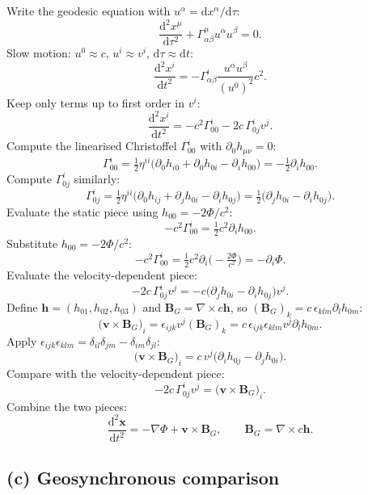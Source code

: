\documentclass[11pt]{article}
\newcommand{\de}{\mathrm{d}}
\renewcommand{\vb}[1]{\mathbf{#1}}
\begin{document}
Write the geodesic equation with $u^{\alpha}=\de x^{\alpha}/\de\tau$:
\[
\frac{\de^{2}x^{\mu}}{\de\tau^{2}}+\Gamma^{\mu}_{\alpha\beta}u^{\alpha}u^{\beta}=0.
\]
Slow motion: $u^{0}\approx c$, $u^{i}\approx v^{i}$, $\de\tau\approx\de t$:
\[
\frac{\de^{2}x^{i}}{\de t^{2}}=-\Gamma^{i}_{\alpha\beta}\frac{u^{\alpha}u^{\beta}}{(u^{0})^{2}}c^{2}.
\]
Keep only terms up to first order in $v^{i}$:
\[
\frac{\de^{2}x^{i}}{\de t^{2}}=-c^{2}\Gamma^{i}_{00}-2c\,\Gamma^{i}_{0j}v^{j}.
\]
Compute the linearised Christoffel $\Gamma^{i}_{00}$ with $\partial_{0}h_{\mu\nu}=0$:
\[
\Gamma^{i}_{00}=\tfrac{1}{2}\eta^{ii}\bigl(\partial_{0}h_{i0}+\partial_{0}h_{0i}-\partial_{i}h_{00}\bigr)=-\tfrac{1}{2}\partial_{i}h_{00}.
\]
Compute $\Gamma^{i}_{0j}$ similarly:
\[
\Gamma^{i}_{0j}=\tfrac{1}{2}\eta^{ii}\bigl(\partial_{0}h_{ij}+\partial_{j}h_{0i}-\partial_{i}h_{0j}\bigr)=\tfrac{1}{2}\bigl(\partial_{j}h_{0i}-\partial_{i}h_{0j}\bigr).
\]
Evaluate the static piece using $h_{00}=-2\Phi/c^{2}$:
\[
-c^{2}\Gamma^{i}_{00}=\tfrac{1}{2}c^{2}\partial_{i}h_{00}.
\]
Substitute $h_{00}=-2\Phi/c^{2}$:
\[
-c^{2}\Gamma^{i}_{00}=\tfrac{1}{2}c^{2}\partial_{i}\!\bigl(-\tfrac{2\Phi}{c^{2}}\bigr)=-\partial_{i}\Phi.
\]
Evaluate the velocity-dependent piece:
\[
-2c\,\Gamma^{i}_{0j}v^{j}=-c\bigl(\partial_{j}h_{0i}-\partial_{i}h_{0j}\bigr)v^{j}.
\]
Define $\vb h=(h_{01},h_{02},h_{03})$ and $\vb B_{G}=\nabla\times c\vb h$, so $(\vb B_{G})_{k}=c\,\epsilon_{klm}\partial_{l}h_{0m}$:
\[
\bigl(\vb v\times\vb B_{G}\bigr)_{i}=\epsilon_{ijk}v^{j}(\vb B_{G})_{k}=c\,\epsilon_{ijk}\epsilon_{klm}v^{j}\partial_{l}h_{0m}.
\]
Apply $\epsilon_{ijk}\epsilon_{klm}=\delta_{il}\delta_{jm}-\delta_{im}\delta_{jl}$:
\[
\bigl(\vb v\times\vb B_{G}\bigr)_{i}=c\,v^{j}\bigl(\partial_{i}h_{0j}-\partial_{j}h_{0i}\bigr).
\]
Compare with the velocity-dependent piece:
\[
-2c\,\Gamma^{i}_{0j}v^{j}=\bigl(\vb v\times\vb B_{G}\bigr)_{i}.
\]
Combine the two pieces:
\begin{equation}
\boxed{\;\frac{\de^{2}\vb x}{\de t^{2}}=-\nabla\Phi+\vb v\times\vb B_{G},\qquad \vb B_{G}=\nabla\times c\vb h.\;}
\label{eq:gravito-eom}
\end{equation}

\subsection*{(c) Geosynchronous comparison}
\end{document}
